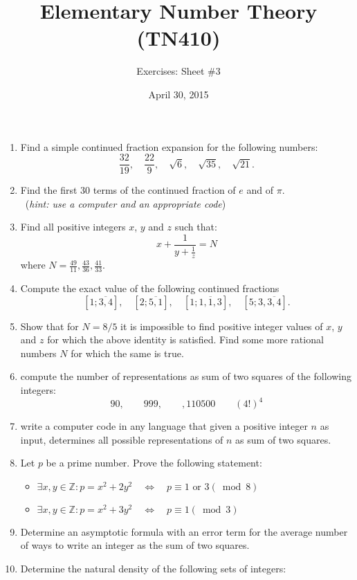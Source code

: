 \documentclass[a4paper,11pt]{article}
\title{Elementary Number Theory (TN410)}
\author{Exercises: Sheet \#3}
\date{April 30, 2015}
\begin{document}
\maketitle
\thispagestyle{empty}

\begin{enumerate}
 \item Find a simple continued fraction expansion for the following numbers:
$$\frac{32}{19},\quad\frac{22}9,\quad\sqrt{6},\quad\sqrt{35},\quad\sqrt{21}.$$
\item Find the first 30 terms of the continued fraction of $e$ and of $\pi$.\\
\phantom{\ }\ \hfill {\tiny(\textit{hint: use a computer and an appropriate code})}
\item Find all positive integers $x$, $y$ and $z$ such that:
    $$x+\frac{1}{y+\frac1z}=N$$
    where $N=\frac{49}{11}, \frac{43}{36}, \frac{41}{33}$.
    \item Compute the exact value of the following continued fractions 
    $$[1;\overline{3,4}],\quad[2;\overline{5,1}],\quad[1;\overline{1,1,3}],\quad[5;3,\overline{3,4}].$$
  \item  Show that for $N=8/5$ it is impossible to find positive integer values of $x$, $y$ and $z$ for which the 
  above identity is satisfied. Find some more rational numbers $N$ for which the same is true.
 \item compute the number of representations as sum of two squares of the following integers:
 $$90,\qquad 999,\qquad,110500\qquad (4!)^4$$ 
 \item write a computer code in any language that given a positive integer $n$ as input, determines all possible representations
 of $n$ as sum of two squares.
 \item Let $p$ be a prime number. Prove the following statement:
 \begin{itemize}
  \item $\exists x,y\in\mathbb Z: p=x^2+2y^2\quad\Longleftrightarrow\quad p\equiv 1 \text{ or } 3(\bmod 8)$
   \item $\exists x,y\in\mathbb Z: p=x^2+3y^2\quad\Longleftrightarrow\quad p\equiv 1(\bmod 3)$
  \end{itemize}
 \item Determine an asymptotic formula with an error term for the average number of ways to write an integer as the sum of two squares.
 \item Determine the natural density of the following sets of integers:
 \begin{enumerate}

\end{enumerate}
\end{enumerate}
\end{document}
